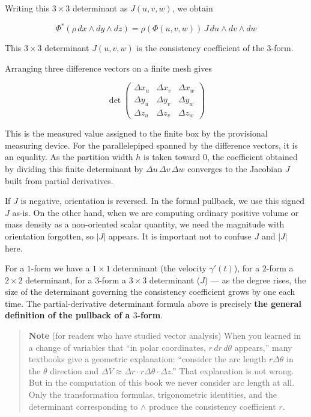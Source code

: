 \documentclass[a4paper,12pt,openany]{book}
\begin{document}
Writing this \(3 \times 3\) determinant as \(J(u,v,w)\), we obtain

\[\Phi^*(\rho\,dx \wedge dy \wedge dz) = \rho(\Phi(u,v,w))\,J\,du \wedge dv \wedge dw\]

This \(3\times3\) determinant \(J(u,v,w)\) is the consistency
coefficient of the \(3\)-form.

Arranging three difference vectors on a finite mesh gives

\[\det\!\begin{pmatrix}
\Delta x_u & \Delta x_v & \Delta x_w \\[2pt]
\Delta y_u & \Delta y_v & \Delta y_w \\[2pt]
\Delta z_u & \Delta z_v & \Delta z_w
\end{pmatrix}\]

This is the measured value assigned to the finite box by the provisional
measuring device. For the parallelepiped spanned by the difference
vectors, it is an equality. As the partition width \(h\) is taken toward
\(0\), the coefficient obtained by dividing this finite determinant by
\(\Delta u\,\Delta v\,\Delta w\) converges to the Jacobian \(J\) built
from partial derivatives.

If \(J\) is negative, orientation is reversed. In the formal pullback,
we use this signed \(J\) as-is. On the other hand, when we are computing
ordinary positive volume or mass density as a non-oriented scalar
quantity, we need the magnitude with orientation forgotten, so \(|J|\)
appears. It is important not to confuse \(J\) and \(|J|\) here.

For a \(1\)-form we have a \(1 \times 1\) determinant (the velocity
\(\gamma'(t)\)), for a \(2\)-form a \(2 \times 2\) determinant, for a
\(3\)-form a \(3 \times 3\) determinant (\(J\)) — as the degree rises,
the size of the determinant governing the consistency coefficient grows
by one each time. The partial-derivative determinant formula above is
precisely \textbf{the general definition of the pullback of a $3$-form}.

\begin{quote}
\textbf{Note} (for readers who have studied vector analysis) When you
learned in a change of variables that ``in polar coordinates,
\(r\,dr\,d\theta\) appears,'' many textbooks give a geometric
explanation: ``consider the arc length \(r\Delta\theta\) in the
\(\theta\) direction and
\(\Delta V \approx \Delta r \cdot r\Delta\theta \cdot \Delta z\).'' That
explanation is not wrong. But in the computation of this book we never
consider arc length at all. Only the transformation formulas,
trigonometric identities, and the determinant corresponding to
\(\wedge\) produce the consistency coefficient \(r\).
\end{quote}
\end{document}
